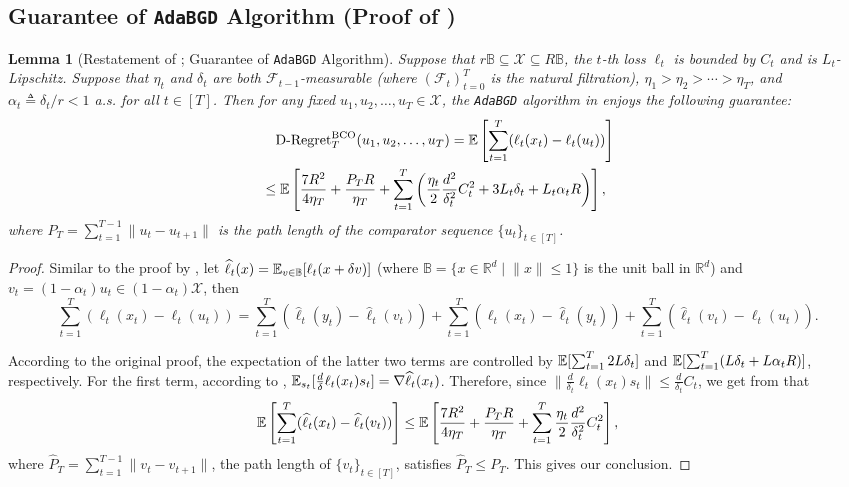 \documentclass[11pt,fullpage,letterpaper]{article} %
\newtheorem{lemma}[theorem]{Lemma}
\renewcommand{\bm}[1]{#1}%
\renewcommand{\hat}{\widehat}
\newcommand{\E}{\operatornamewithlimits{\mathbb{E}}}
\newcommand{\BCOAlg}{\texttt{AdaBGD}\xspace}
\begin{document}
\subsection{Guarantee of \BCOAlg Algorithm (Proof of )}\label{sec:ABGD guarantee}
\begin{lemma}[Restatement of ; Guarantee of \BCOAlg Algorithm]
Suppose that $r\mathbb B\subseteq \mathcal X\subseteq R\mathbb B$, the $t$-th loss $\ell_t$ is bounded by $C_t$ and is $L_t$-Lipschitz.
Suppose that $\eta_t$ and $\delta_t$ are both $\mathcal F_{t-1}$-measurable (where $(\mathcal F_t)_{t=0}^T$ is the natural filtration), $\eta_1>\eta_2>\cdots>\eta_T$, and $\alpha_t\triangleq \delta_t / r<1$ \textit{a.s.} for all $t\in [T]$. Then for any fixed $\bm u_1,\bm u_2,\ldots,\bm u_T\in \mathcal X$, the \BCOAlg algorithm in  enjoys the following guarantee:
\begin{align*}
&\quad \text{D-Regret}_T^{\text{BCO}}(\bm u_1,\bm u_2,\ldots,\bm u_T)=\E\left [\sum_{t=1}^T (\ell_t(\bm x_t)-\ell_t(\bm u_t))\right ]\\
&\le \E\left [\frac{7R^2}{4\eta_T}+\frac{P_T R}{\eta_T}+\sum_{t=1}^T \left (\frac{\eta_t}{2} \frac{d^2}{\delta_t^2} C_t^2 + 3L_t \delta_t + L_t \alpha_t R\right )\right ],
\end{align*}
where $P_T=\sum_{t=1}^{T-1}\lVert \bm u_t-\bm u_{t+1}\rVert$ is the path length of the comparator sequence $\{\bm u_t\}_{t\in [T]}$.
\end{lemma}
\begin{proof}
Similar to the proof by \citet[Theorem 1]{zhao2021bandit}, let $\hat \ell_t(\bm x)=\E_{\bm v\in \mathbb B}[\ell_t(\bm x+\delta \bm v)]$ (where $\mathbb B=\{\bm x\in \mathbb R^d\mid \lVert \bm x\rVert\le 1\}$ is the unit ball in $\mathbb R^d$) and $\bm v_t=(1-\alpha_t)\bm u_t\in (1-\alpha_t) \mathcal X$, then
\begin{equation*}
\sum_{t=1}^T (\ell_t(\bm x_t)-\ell_t(\bm u_t))=\sum_{t=1}^T (\hat \ell_t(\bm y_t)-\hat \ell_t(\bm v_t))+\sum_{t=1}^T (\ell_t(\bm x_t) - \hat \ell_t(\bm y_t)) + \sum_{t=1}^T (\hat \ell_t(\bm v_t) - \ell_t(\bm u_t)).
\end{equation*}

According to the original proof, the expectation of the latter two terms are controlled by $\E[\sum_{t=1}^T 2L \delta_t]$ and $\E[\sum_{t=1}^T (L\delta_t + L \alpha_t R)]$, respectively.
For the first term, according to \citet[Lemma 2.1]{flaxman2005online}, $\E_{\bm s_t}[\frac d\delta \ell_t(\bm x_t) \bm s_t]=\nabla \hat \ell_t(\bm x_t)$.
Therefore, since $\lVert \frac d{\delta_t} \ell_t(\bm x_t) \bm s_t\rVert\le \frac d{\delta_t} C_t$, we get from  that
\begin{equation*}
\E\left [\sum_{t=1}^T (\hat \ell_t(\bm x_t)-\hat \ell_t(\bm v_t))\right ]\le \E\left [\frac{7R^2}{4\eta_T}+\frac{P_T R}{\eta_T}+\sum_{t=1}^T \frac{\eta_t}{2} \frac{d^2}{\delta_t^2} C_t^2\right ],
\end{equation*}
where $\hat P_T=\sum_{t=1}^{T-1}\lVert \bm v_t-\bm v_{t+1}\rVert$, the path length of $\{\bm v_t\}_{t\in [T]}$, satisfies $\hat P_T\le P_T$. This gives our conclusion.
\end{proof}
\end{document}
